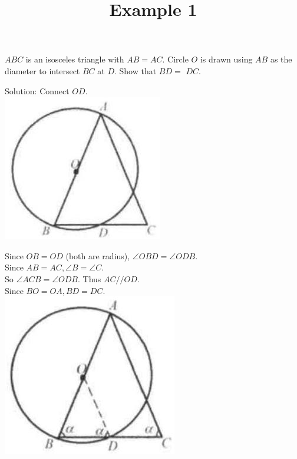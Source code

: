 \documentclass{article}
\title{Example 1}
\date{}
\begin{document}
\maketitle

\(A B C\) is an isosceles triangle with \(A B=A C\). Circle \(O\) is drawn using \(A B\) as the diameter to intersect \(B C\) at \(D\). Show that \(B D=\) \(D C\).

Solution:
Connect \(O D\).\\
\centering
\includegraphics[width=\textwidth]{images/problem_image_1.jpg}

Since \(O B=O D\) (both are radius), \(\angle O B D=\angle O D B\).\\
Since \(A B=A C, \angle B=\angle C\).\\
So \(\angle A C B=\angle O D B\). Thus \(A C / / O D\).\\
Since \(B O=O A, B D=D C\).\\
\centering
\includegraphics[width=\textwidth]{images/reasoning_image_1.jpg}
\end{document}
